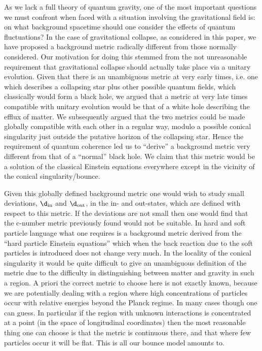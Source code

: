 \bigskip
{}
\medskip
As we lack a full theory of quantum gravity, one of the most important
questions we must confront when faced with a situation involving the
gravitational field is: on what background spacetime should one
consider the effects of quantum fluctuations? In the case of
gravitational collapse, as considered in this paper, we have proposed a
background metric radically different from those normally considered. Our
motivation for doing this stemmed from the not unreasonable requirement
that gravitational collapse should actually take place via a unitary
evolution. Given that there is an unambiguous metric at very early
times, i.e. one which describes a collapsing star plus other possible
quantum fields, which classically would form a black hole, we argued
that a metric at very late times compatible with unitary evolution would be
that of a white hole describing the efflux of matter. We subsequently
argued that the two metrics could be made globally compatible with each
other in a regular way, modulo a possible conical singularity just
outside the putative horizon of the collapsing star. Hence the
requirement of quantum coherence led us to ``derive'' a background
metric very different from that of a ``normal'' black hole. We claim
that this metric would be a solution of the classical Einstein
equations everywhere except in the vicinity of the conical
singularity/bounce.

Given this globally defined background metric one would wish to study
small deviations, $\d_{\rm in}$ and $\d_{\rm out}$, in the in- and
out-states, which are defined with respect to this metric. If the
deviations are not small then one would find that the c-number metric
previously found would not be suitable.  In hard and soft particle
language what one requires is a background metric derived from the
``hard particle Einstein equations'' which when the back reaction due
to the soft particles is introduced does not change very much.  In the
locality of the conical singularity it would be quite difficult to give
an unambiguous definition of the metric due to the difficulty in
distinguishing between matter and gravity in such a region. A priori
the correct metric to choose here is not exactly known, because we are
potentially dealing with a region where high concentrations of
particles occur with relative energies beyond the Planck regime. In
many cases though one can guess. In particular if the region with
unknown interactions is concentrated at a point (in the space of
longitudinal coordinates) then the most reasonable thing one can choose
is that the metric is continuous there, and that where few particles
occur it will be flat. This is all our bounce model amounts to.

